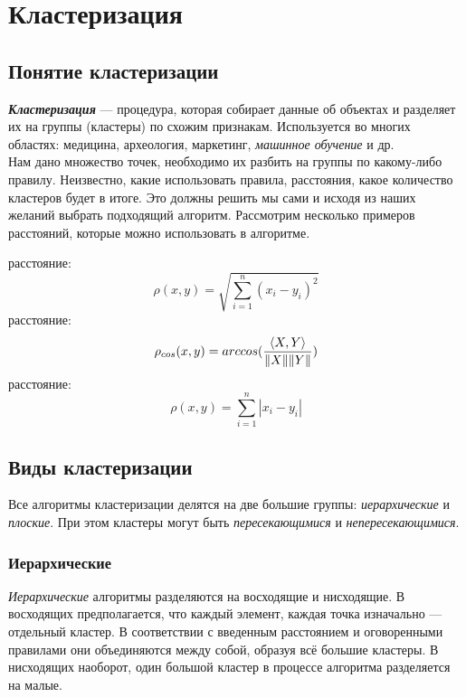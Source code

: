 \documentclass[12pt, a4paper]{article}
\begin{document}
\section{Кластеризация}
\subsection{Понятие кластеризации}
\textit{\textbf{Кластеризация}}  —  процедура, которая собирает данные об объектах и разделяет их на группы (кластеры) по схожим признакам. Используется во многих областях: медицина, археология, маркетинг, \textit{машинное обучение} и др.\\
Нам дано множество точек, необходимо их разбить на группы по какому-либо правилу. Неизвестно, какие использовать правила, расстояния, какое количество кластеров будет в итоге. Это должны решить мы сами и исходя из наших желаний выбрать подходящий алгоритм. Рассмотрим несколько примеров расстояний, которые можно использовать в алгоритме.\\
\begin{itemize}
 расстояние: 
\begin{equation}\label{eq:one}
\rho (x, y) = \sqrt{\sum_{i=1}^n (x_i - y_i)^2}
\end{equation}
 расстояние:
\begin{equation}\label{eq:two}
\rho_{cos} (x, y) = arccos({{\langle X,Y\rangle}\over{\| X \| \| Y \|}})
\end{equation}
 расстояние:
\begin{equation}\label{eq:three}
\rho (x, y) = \sum_{i=1}^n |x_i - y_i|
\end{equation}
\end{itemize}
\subsection{Виды кластеризации}
Все алгоритмы кластеризации делятся на две большие группы: \textit{иерархические} и \textit{плоские}. При этом кластеры могут быть \textit{пересекающимися} и \textit{непересекающимися}.\\
\subsubsection{Иерархические}\textit{Иерархические} алгоритмы разделяются на восходящие и нисходящие. В восходящих предполагается, что каждый элемент, каждая точка изначально — отдельный кластер. В соответствии с введенным расстоянием и оговоренными правилами они объединяются  между собой, образуя всё большие кластеры. В нисходящих наоборот, один большой кластер в процессе алгоритма разделяется на малые. \\
\end{document}
